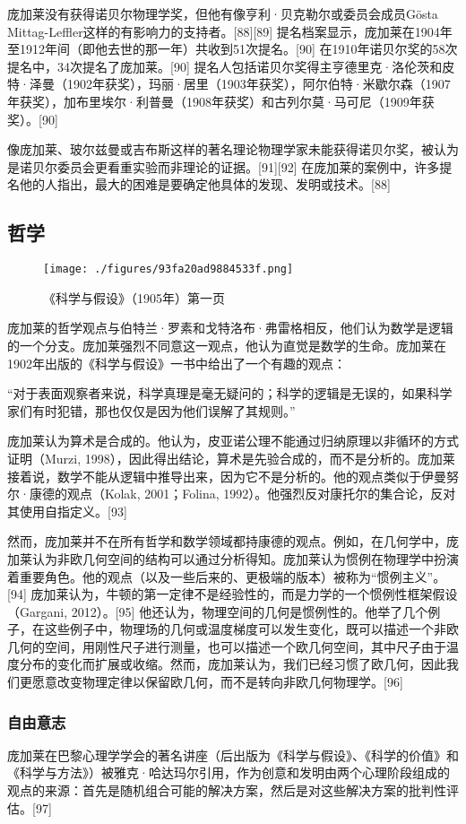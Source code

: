 庞加莱没有获得诺贝尔物理学奖，但他有像亨利·贝克勒尔或委员会成员Gösta Mittag-Leffler这样的有影响力的支持者。[88][89] 提名档案显示，庞加莱在1904年至1912年间（即他去世的那一年）共收到51次提名。[90] 在1910年诺贝尔奖的58次提名中，34次提名了庞加莱。[90] 提名人包括诺贝尔奖得主亨德里克·洛伦茨和皮特·泽曼（1902年获奖），玛丽·居里（1903年获奖），阿尔伯特·米歇尔森（1907年获奖），加布里埃尔·利普曼（1908年获奖）和古列尔莫·马可尼（1909年获奖）。[90]

像庞加莱、玻尔兹曼或吉布斯这样的著名理论物理学家未能获得诺贝尔奖，被认为是诺贝尔委员会更看重实验而非理论的证据。[91][92] 在庞加莱的案例中，许多提名他的人指出，最大的困难是要确定他具体的发现、发明或技术。[88]
\subsection{哲学}
\begin{figure}[ht]
\centering
\texttt{[image: ./figures/93fa20ad9884533f.png]}
\caption{《科学与假设》（1905年）第一页} \label{fig_HLPJL_6}
\end{figure}
庞加莱的哲学观点与伯特兰·罗素和戈特洛布·弗雷格相反，他们认为数学是逻辑的一个分支。庞加莱强烈不同意这一观点，他认为直觉是数学的生命。庞加莱在1902年出版的《科学与假设》一书中给出了一个有趣的观点：

“对于表面观察者来说，科学真理是毫无疑问的；科学的逻辑是无误的，如果科学家们有时犯错，那也仅仅是因为他们误解了其规则。”

庞加莱认为算术是合成的。他认为，皮亚诺公理不能通过归纳原理以非循环的方式证明（Murzi, 1998），因此得出结论，算术是先验合成的，而不是分析的。庞加莱接着说，数学不能从逻辑中推导出来，因为它不是分析的。他的观点类似于伊曼努尔·康德的观点（Kolak, 2001；Folina, 1992）。他强烈反对康托尔的集合论，反对其使用自指定义。[93]

然而，庞加莱并不在所有哲学和数学领域都持康德的观点。例如，在几何学中，庞加莱认为非欧几何空间的结构可以通过分析得知。庞加莱认为惯例在物理学中扮演着重要角色。他的观点（以及一些后来的、更极端的版本）被称为“惯例主义”。[94] 庞加莱认为，牛顿的第一定律不是经验性的，而是力学的一个惯例性框架假设（Gargani, 2012）。[95] 他还认为，物理空间的几何是惯例性的。他举了几个例子，在这些例子中，物理场的几何或温度梯度可以发生变化，既可以描述一个非欧几何的空间，用刚性尺子进行测量，也可以描述一个欧几何空间，其中尺子由于温度分布的变化而扩展或收缩。然而，庞加莱认为，我们已经习惯了欧几何，因此我们更愿意改变物理定律以保留欧几何，而不是转向非欧几何物理学。[96]
\subsubsection{自由意志}
庞加莱在巴黎心理学学会的著名讲座（后出版为《科学与假设》、《科学的价值》和《科学与方法》）被雅克·哈达玛尔引用，作为创意和发明由两个心理阶段组成的观点的来源：首先是随机组合可能的解决方案，然后是对这些解决方案的批判性评估。[97]

